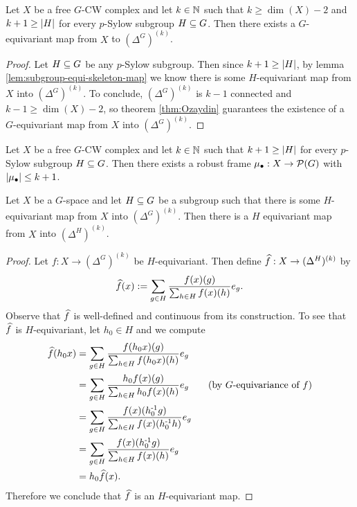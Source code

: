 \begin{theorem}
    Let $X$ be a free $G$-CW complex and let $k \in \N$ such that $k \geq \dim(X) - 2$ and $k + 1 \geq \card{H}$ for every $p$-Sylow subgroup $H \sub G$.
    Then there exists a $G$-equivariant map from $X$ to $(\Delta^G)^{(k)}$.
    \begin{proof}
        Let $H \sub G$ be any $p$-Sylow subgroup.
        Then since $k + 1 \geq \card{H}$, by lemma \ref{lem:subgroup-equi-skeleton-map} we know there is some $H$-equivariant map from $X$ into $(\Delta^G)^{(k)}$.
        To conclude, $(\Delta^G)^{(k)}$ is $k-1$ connected and $k-1 \geq \dim(X)-2$, so theorem \ref{thm:Ozaydin} guarantees the existence of a $G$-equivariant map from $X$ into $(\Delta^G)^{(k)}$.
    \end{proof}
\end{theorem}


\begin{corollary}
    Let $X$ be a free $G$-CW complex and let $k \in \N$ such that $k + 1 \geq \card{H}$ for every $p$-Sylow subgroup $H \sub G$.
    Then there exists a robust frame $\mu_\bullet : X \to \PP(G)$ with $\card{\mu_\bullet} \leq k + 1$.
\end{corollary}


\begin{lemma}\label{lem:subgroup-equi-map-simplex}
    Let $X$ be a $G$-space and let $H \sub G$ be a subgroup such that there is some $H$-equivariant map from $X$ into $(\Delta^G)^{(k)}$.
    Then there is a $H$ equivariant map from $X$ into $(\Delta^H)^{(k)}$.
    \begin{proof}
        Let $f : X \to (\Delta^G)^{(k)}$ be $H$-equivariant.
        Then define $\Hat{f} : X \to (\Delta^H)^{(k)}$ by
        \[
            \Hat{f}(x)
            := \sum_{g \in H} \f{f(x)(g)}{\sum_{h \in H} f(x)(h)} e_g.
        \]
        Observe that $\Hat{f}$ is well-defined and continuous from its construction.
        To see that $\Hat{f}$ is $H$-equivariant, let $h_0 \in H$ and we compute
        \begin{align*}
            \Hat{f}(h_0 x)
            &= \sum_{g \in H} \f{f(h_0 x)(g)}{\sum_{h \in H} f(h_0 x)(h)} e_g \\
            &= \sum_{g \in H} \f{h_0 f(x)(g)}{\sum_{h \in H} h_0 f(x)(h)} e_g \tag{by $G$-equivariance of $f$} \\
            &= \sum_{g \in H} \f{f(x)(\inv{h_0} g)}{\sum_{h \in H} f(x)(\inv{h_0} h)} e_g \\
            &= \sum_{g \in H} \f{f(x)(\inv{h_0} g)}{\sum_{h \in H} f(x)(h)} e_g \\
            &= h_0 \Hat{f}(x).
        \end{align*}
        Therefore we conclude that $\Hat{f}$ is an $H$-equivariant map.
    \end{proof}
\end{lemma}


